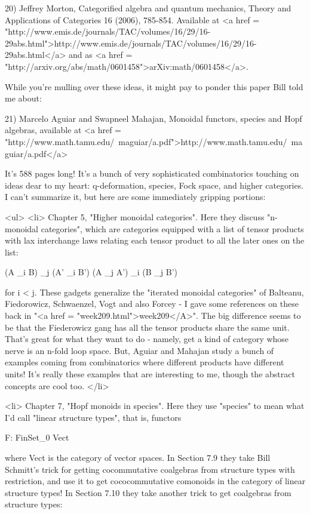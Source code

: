 20) Jeffrey Morton, Categorified algebra and quantum mechanics, 
Theory and Applications of Categories 16 (2006), 785-854.
Available at <a href = "http://www.emis.de/journals/TAC/volumes/16/29/16-29abs.html">http://www.emis.de/journals/TAC/volumes/16/29/16-29abs.html</a>
and as <a href = "http://arxiv.org/abs/math/0601458">arXiv:math/0601458</a>.


While you're mulling over these ideas, it might pay to ponder
this paper Bill told me about:

21) Marcelo Aguiar and Swapneel Mahajan, Monoidal functors, species
and Hopf algebras, available at <a href = "http://www.math.tamu.edu/~maguiar/a.pdf">http://www.math.tamu.edu/~maguiar/a.pdf</a>

It's 588 pages long!  It's a bunch of very sophisticated combinatorics
touching on ideas dear to my heart: q-deformation, species, Fock space,
and higher categories.  I can't summarize it, but here are some 
immediately gripping portions:

<ul>
<li>
Chapter 5, "Higher monoidal categories".  Here they discuss 
"n-monoidal categories", which are categories equipped with a list 
of tensor products with lax interchange laws relating each tensor
product to all the later ones on the list:

(A \otimes _{i} B) \otimes _{j} (A' \otimes _{i} B') \to 
(A \otimes _{j} A') \otimes _{i} (B \otimes _{j} B')

for i < j.  These gadgets generalize the "iterated monoidal
categories" of Balteanu, Fiedorowicz, Schwaenzel, Vogt and also
Forcey - I gave some references on these back in "<a href =
"week209.html">week209</A>".  The big difference seems to be that
the Fiederowicz gang has all the tensor products share the same unit.
That's great for what they want to do - namely, get a kind of category
whose nerve is an n-fold loop space.  But, Aguiar and Mahajan study a
bunch of examples coming from combinatorics where different products
have different units!  It's really these examples that are interesting
to me, though the abstract concepts are cool too.  
</li>

<li>
Chapter 7, "Hopf monoids in species".  Here they use 
"species" to 
mean what I'd call "linear structure types", that is, functors

F: FinSet_{0} \to  Vect

where Vect is the category of vector spaces.   In Section 7.9 they
take Bill Schmitt's trick for getting cocommutative coalgebras from
structure types with restriction, and use it to get cococommutative
comonoids in the category of linear structure types!  In Section 7.10
they take another trick to get coalgebras from structure types:

